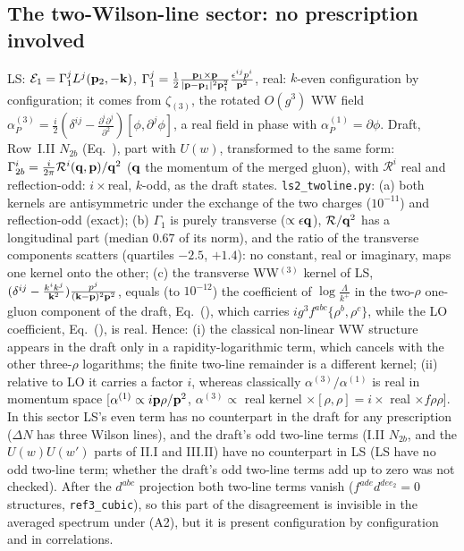 \subsection{The two-Wilson-line sector: no prescription involved}\label{ls:twoline}
LS: $\mathcal E_1=\Gamma_1^jL^j(\mathbf{p}_2,-\mathbf{k})$, $\Gamma_1^j=\frac12\frac{\mathbf{p}_1\times\mathbf{p}}{|\mathbf{p}-\mathbf{p}_1|^2\mathbf{p}_1^2}\frac{\epsilon^{ij}p^i}{\mathbf{p}^2}$, real: $k$-even configuration by configuration; it comes from $\zeta_{(3)}$, the rotated $O(g^3)$ WW field $\alpha^{(3)}_P=\frac i2(\delta^{ij}-\frac{\partial^i\partial^j}{\partial^2})[\phi,\partial^j\phi]$, a real field in phase with $\alpha^{(1)}_P=\partial\phi$. Draft, Row~I.II $N_{2b}$ (Eq.~), part with $U(w)$, transformed to the same form: $\Gamma_{2b}^i=\frac{i}{2\pi}\mathcal R^i(\mathbf{q},\mathbf{p})/\mathbf{q}^2$ ($\mathbf{q}$ the momentum of the merged gluon), with $\mathcal R^i$ real and reflection-odd: $i\times$real, $k$-odd, as the draft states. \texttt{ls2\_twoline.py}: (a) both kernels are antisymmetric under the exchange of the two charges ($10^{-11}$) and reflection-odd (exact); (b) $\Gamma_1$ is purely transverse ($\propto\epsilon\mathbf{q}$), $\mathcal R/\mathbf{q}^2$ has a longitudinal part (median $0.67$ of its norm), and the ratio of the transverse components scatters (quartiles $-2.5$, $+1.4$): no constant, real or imaginary, maps one kernel onto the other; (c) the transverse WW$^{(3)}$ kernel of LS, $(\delta^{ij}-\frac{k^ik^j}{\mathbf{k}^2})\frac{p^j}{(\mathbf{k}-\mathbf{p})^2\mathbf{p}^2}$, equals (to $10^{-12}$) the coefficient of $\log\frac{\Lambda}{k^+}$ in the two-$\rho$ one-gluon component of the draft, Eq.~(), which carries $ig^3f^{abc}\{\rho^b,\rho^c\}$, while the LO coefficient, Eq.~(), is real. Hence: (i) the classical non-linear WW structure appears in the draft only in a rapidity-logarithmic term, which cancels with the other three-$\rho$ logarithms; the finite two-line remainder is a different kernel; (ii) relative to LO it carries a factor $i$, whereas classically $\alpha^{(3)}/\alpha^{(1)}$ is real in momentum space [$\alpha^{(1)}\propto i\mathbf{p}\rho/\mathbf{p}^2$, $\alpha^{(3)}\propto$ real kernel $\times[\rho,\rho]=i\times$ real $\times f\rho\rho$]. In this sector LS's even term has no counterpart in the draft for any prescription ($\Delta N$ has three Wilson lines), and the draft's odd two-line terms (I.II $N_{2b}$, and the $U(w)U(w')$ parts of II.I and III.II) have no counterpart in LS (LS have no odd two-line term; whether the draft's odd two-line terms add up to zero was not checked). After the $d^{abc}$ projection both two-line terms vanish ($f^{ade}d^{dee_2}=0$ structures, \texttt{ref3\_cubic}), so this part of the disagreement is invisible in the averaged spectrum under (A2), but it is present configuration by configuration and in correlations.

